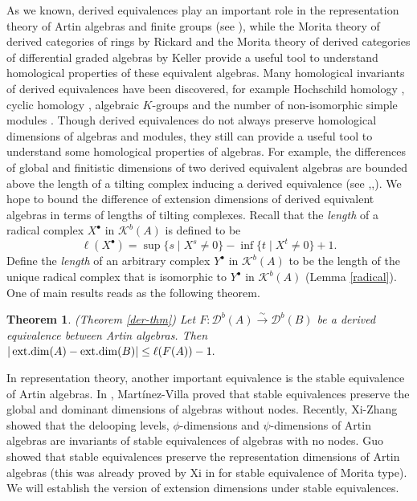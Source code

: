 \documentclass[12pt]{article}
\numberwithin{equation}{section}
\newtheorem{Theo}[Def]{Theorem}
\theoremstyle{definition}
\def\ed{\mathop{\rm ext.dim}\nolimits}
\newcommand{\cpx}[1]{#1^{\bullet}}
\newcommand{\Db}[1]{{\mathscr D}^b(#1)}
\newcommand{\Kb}[1]{{\mathscr K}^b(#1)}
\newcommand{\lra}{\longrightarrow}
\newcommand{\lraf}[1]{\stackrel{#1}{\lra}}
\begin{document}
As we known, derived equivalences play an important role in the representation theory of Artin algebras and finite groups (see \cite{h88, Xi18}), while the Morita theory of derived categories of rings by Rickard \cite{r1989}  and the Morita theory of derived categories of differential graded algebras by Keller \cite{k94} provide a useful tool to understand homological properties of these equivalent algebras. Many homological invariants of derived equivalences have been discovered, for example Hochschild homology \cite{r91}, cyclic homology \cite{k98}, algebraic $K$-groups \cite{ds04} and the number of non-isomorphic simple modules \cite{r1989}. Though derived equivalences do not always preserve homological dimensions of algebras and modules, they still can provide a useful tool to understand some homological properties of algebras. For example, the differences of global and finitistic dimensions of two derived equivalent algebras are bounded above the length of a tilting complex inducing a derived equivalence (see \cite[Section 12.5(b)]{gr92},\cite{h93},\cite{px09}). We hope to bound the difference of extension dimensions of derived equivalent algebras in terms of lengths of tilting complexes. Recall that the \emph{length} of a radical complex $\cpx{X}$ in $\Kb{A}$ is defined to be
$$\ell(\cpx{X}) = \sup\{s\mid X^s\neq 0\} - \inf\{t\mid X^t\neq 0\} +1.$$
Define the \emph{length} of an arbitrary complex $\cpx{Y}$ in $\Kb{A}$ to be the length of the unique radical complex that is isomorphic to $\cpx{Y}$ in $\Kb{A}$ (Lemma \ref{radical}). One of main results reads as the following theorem.

\begin{Theo}\label{main-der}{\rm (Theorem \ref{der-thm})} Let $F:\Db{A}\lraf{\sim} \Db{B}$ be a derived equivalence between Artin algebras. Then $|\ed(A)-\ed(B)|\le \ell(F(A))-1.$
\end{Theo}

In representation theory, another important equivalence is the stable equivalence of Artin algebras. In \cite{MV1990}, Mart\'inez-Villa proved that stable equivalences preserve the global and dominant dimensions of algebras without nodes.
Recently, Xi-Zhang  \cite{Xi2022} showed that the delooping levels, $\phi$-dimensions and $\psi$-dimensions of Artin algebras are invariants of stable equivalences of algebras with no nodes. Guo \cite{Guo05} showed that stable equivalences preserve the representation dimensions of Artin algebras (this was already proved by Xi in \cite{Xi02} for stable equivalence of Morita type). We will establish the version of extension dimensions under stable equivalences.
\end{document}
